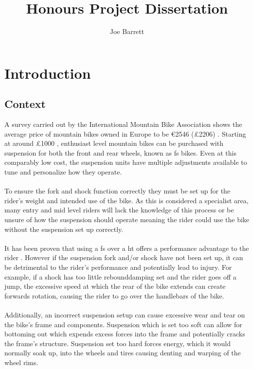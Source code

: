 \documentclass[a4paper, 12pt, hidelinks]{article}
\title{Honours Project Dissertation}
\author{Joe Barrett}
\begin{document}
	\setcounter{secnumdepth}{4}
	
	\begin{abstract}
		\blindtext
	\end{abstract}
	\newpage
	\tableofcontents
	\newpage
	\listoftables
	\newpage
	\listoffigures
	\newpage
	\section{Introduction}
	\subsection{Context}
	A survey carried out by the International Mountain Bike Association shows the average price of mountain bikes owned in Europe to be \euro2546 (\pounds2206) \citep{imbasurv}. Starting at around \pounds1000 \citep{giantstance}, enthusiast level mountain bikes can be purchased with suspension for both the front and rear wheels, known as \gls{fs} bikes. Even at this comparably low cost, the suspension units have multiple adjustments available to tune and personalize how they operate.
	\\\\
	To ensure the \gls{fork} and \gls{shock} function correctly they must be set up for the rider's weight and intended use of the bike. As this is considered a specialist area, many entry and mid level riders will lack the knowledge of this process or be unsure of how the suspension should operate meaning the rider could use the bike without the suspension set up correctly.
	\\\\
	It has been proven that using a \gls{fs} over a \gls{ht} offers a performance advantage to the rider \citep{fullsusperf}. However if the suspension fork and/or shock have not been set up, it can be detrimental to the rider's performance and potentially lead to injury. For example, if a shock has too little \gls{rebounddamping} set and the rider goes off a jump, the excessive speed at which the rear of the bike extends can create forwards rotation, causing the rider to go over the handlebars of the bike.
	\\\\
	Additionally, an incorrect suspension setup can cause excessive wear and tear on the bike's frame and components. Suspension which is set too soft can allow for bottoming out which expends excess forces into the frame and potentially cracks the frame's structure. Suspension set too hard forces energy, which it would normally soak up, into the wheels and tires causing denting and warping of the wheel rims.
\end{document}
